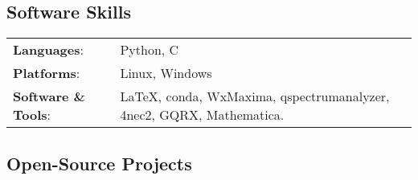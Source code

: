 \subsection{Software Skills}
    \begin{tabular}{P{0.25\textwidth} P{0.7\textwidth}}
        \textbf{Languages}: & Python, C \\
        \textbf{Platforms}: & Linux, Windows \\
        \textbf{Software \& Tools}: & \LaTeX, conda, WxMaxima, qspectrumanalyzer, 4nec2, GQRX, Mathematica. \\
    \end{tabular}
    \vspace*{-0.25cm}
\subsection{Open-Source Projects}
